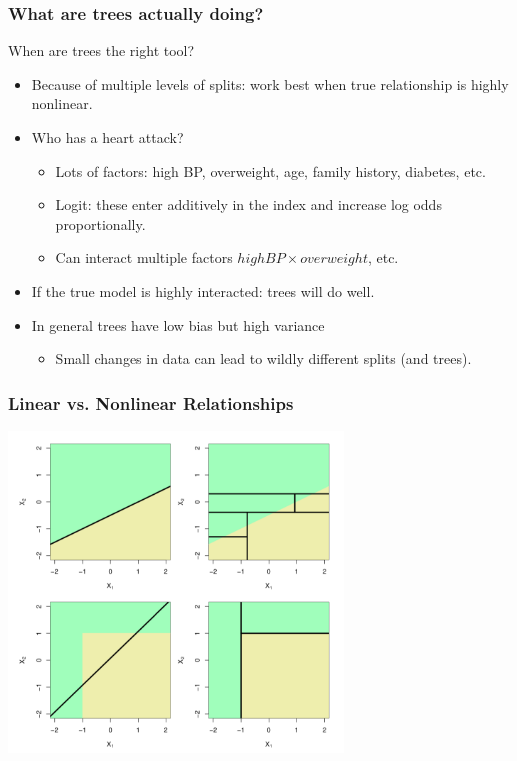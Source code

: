 \documentclass[xcolor=pdftex,dvipsnames,table,mathserif,aspectratio=169]{beamer}
\begin{document}
\begin{frame}
\frametitle{What are trees actually doing?}
When are trees the right tool?
\begin{itemize}
\item Because of multiple levels of splits: work best when true relationship is highly nonlinear.
\item Who has a heart attack?
\begin{itemize}
\item Lots of factors: high BP, overweight, age, family history, diabetes, etc.
\item  Logit:  these enter \alert{additively} in the index and increase \alert{log odds proportionally}.
\item Can interact multiple factors $highBP \times overweight$, etc.
\end{itemize}
\item If the true model is highly interacted: trees will do well.
\item In general trees have \alert{low bias} but \alert{high variance}
\begin{itemize}
\item Small changes in data can lead to wildly different splits (and trees).
\end{itemize}
\end{itemize}
\end{frame}


\begin{frame}
\frametitle{Linear vs. Nonlinear Relationships}
\begin{center}
\includegraphics[width=3.5in]{./resources/treefit.png}
\end{center}
\end{frame}
\end{document}
